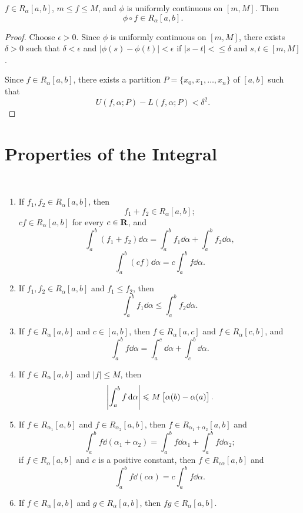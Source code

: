 \begin{proposition}
$f\in R_\alpha[a,b]$, $m\le f\le M$, and $\phi$ is uniformly continuous on $[m,M]$. Then
\[\phi\circ f\in R_\alpha[a,b].\]
\end{proposition}

\begin{proof}
Choose $\epsilon>0$. Since $\phi$ is uniformly continuous on $[m,M]$, there exists $\delta>0$ such that $\delta<\epsilon$ and $|\phi(s)-\phi(t)|<\epsilon$ if $|s-t|<\le\delta$ and $s,t\in[m,M]$.

Since $f\in R_\alpha[a,b]$, there exists a partition $P=\{x_0,x_1,\dots,x_n\}$ of $[a,b]$ such that
\[U(f,\alpha;P)-L(f,\alpha;P)<\delta^2.\]

\end{proof}

\section{Properties of the Integral}
\begin{theorem} \
\begin{enumerate}[label=(\arabic*)]
\item If $f_1,f_2\in R_\alpha[a,b]$, then 
\[ f_1+f_2\in R_\alpha[a,b]; \]
$cf\in R_\alpha[a,b]$ for every $c\in\mathbf R$, and
\[ \int_a^b(f_1+f_2)\dd{\alpha}=\int_a^bf_1\dd{\alpha}+\int_a^bf_2\dd{\alpha}, \]
\[ \int_a^b(cf)\dd{\alpha}=c\int_a^bf\dd{\alpha}. \]

\item If $f_1,f_2\in R_\alpha[a,b]$ and $f_1\le f_2$, then
\[ \int_a^bf_1\dd{\alpha}\le\int_a^bf_2\dd{\alpha}. \]

\item If $f\in R_\alpha[a,b]$ and $c\in[a,b]$, then $f\in R_\alpha[a,c]$ and $f\in R_\alpha[c,b]$, and
\[ \int_a^bf\dd{\alpha}=\int_a^c\dd{\alpha}+\int_c^b\dd{\alpha}. \]

\item If $f\in R_\alpha[a,b]$ and $|f|\le M$, then
\[ \left|\int_a^bf\dd{\alpha}\right|\leqslant M\left[\alpha(b)-\alpha(a)\right]. \]

\item If $f\in R_{\alpha_1}[a,b]$ and $f\in R_{\alpha_2}[a,b]$, then $f\in R_{\alpha_1+\alpha_2}[a,b]$ and
\[ \int_a^bf\dd{(\alpha_1+\alpha_2)}=\int_a^bf\dd{\alpha_1}+\int_a^bf\dd{\alpha_2}; \]
if $f\in R_\alpha[a,b]$ and $c$ is a positive constant, then $f\in R_{c\alpha}[a,b]$ and
\[ \int_a^bf\dd{(c\alpha)}=c\int_a^bf\dd{\alpha}. \]

\item If $f\in R_\alpha[a,b]$ and $g\in R_\alpha[a,b]$, then $fg\in R_\alpha[a,b]$.
\end{enumerate}
\end{theorem}

